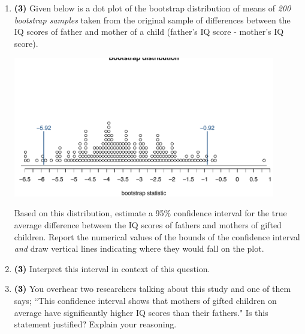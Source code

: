 \documentclass[11pt]{article}
\newcommand{\soln}[1]{ \vspace{1.35cm} }
\newcommand{\pts}[1]{ \textbf{{\footnotesize \textcolor{black}{(#1)}}} }	%
\begin{document}
\begin{enumerate}
\begin{enumerate}

\item \pts{3} Given below is a dot plot of the bootstrap distribution of means of \emph{200 bootstrap samples} taken from the original sample of differences between the IQ scores of father and mother of a child (father's IQ score - mother's IQ score).
\begin{center}
\includegraphics[width=0.9\textwidth]{figures/gifted/iqdiff_boot_soln}
\end{center}
Based on this distribution, estimate a 95\% confidence interval for the true average difference between the IQ scores of fathers and mothers of gifted children. Report the numerical values of the bounds of the confidence interval \emph{and} draw vertical lines indicating where they would fall on the plot.


\soln{Lower bound: any answer between -5.75 and -6 accepted. Upper bound: any answer between -0.75 and -1 accepted.\\
Exact: (-5.92, -0.92)}

\item \pts{3} Interpret this interval in context of this question. 

\soln{We are 95\% confident that the average IQ scores of fathers of gifted children are 5.92 to 0.92 points lower than their mothers' IQ scores.}

\vfill
\pagebreak

%

\item \pts{3} You overhear two researchers talking about this study and one of them says; ``This confidence interval shows that mothers of gifted children on average have significantly higher IQ scores than their fathers." Is this statement justified? Explain your reasoning.

\soln{Yes, the confidence interval doesn't include 0, and both bounds are negative, suggesting mothers of gifted children on average have significantly higher IQ scores than their fathers.}
$\:$\\
$\:$\\


\end{enumerate}
\end{enumerate}
\end{document}
